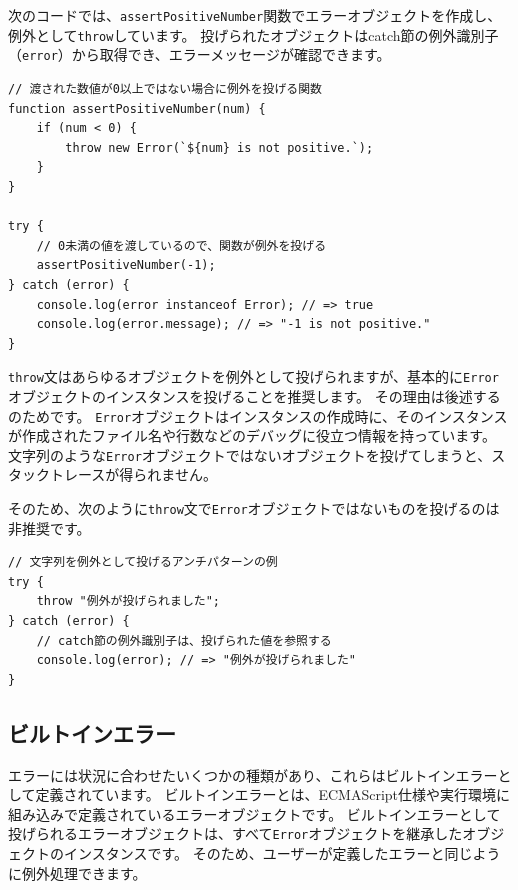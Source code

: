 次のコードでは、\texttt{assertPositiveNumber}関数でエラーオブジェクトを作成し、例外として\texttt{throw}しています。
投げられたオブジェクトはcatch節の例外識別子（\texttt{error}）から取得でき、エラーメッセージが確認できます。

\begin{lstlisting}
// 渡された数値が0以上ではない場合に例外を投げる関数
function assertPositiveNumber(num) {
    if (num < 0) {
        throw new Error(`${num} is not positive.`);
    }
}

try {
    // 0未満の値を渡しているので、関数が例外を投げる
    assertPositiveNumber(-1);
} catch (error) {
    console.log(error instanceof Error); // => true
    console.log(error.message); // => "-1 is not positive."
}
\end{lstlisting}

\texttt{throw}文はあらゆるオブジェクトを例外として投げられますが、基本的に\texttt{Error}オブジェクトのインスタンスを投げることを推奨します。
その理由は後述する\textbf{}のためです。
\texttt{Error}オブジェクトはインスタンスの作成時に、そのインスタンスが作成されたファイル名や行数などのデバッグに役立つ情報を持っています。
文字列のような\texttt{Error}オブジェクトではないオブジェクトを投げてしまうと、スタックトレースが得られません。

そのため、次のように\texttt{throw}文で\texttt{Error}オブジェクトではないものを投げるのは非推奨です。

\begin{lstlisting}
// 文字列を例外として投げるアンチパターンの例
try {
    throw "例外が投げられました";
} catch (error) {
    // catch節の例外識別子は、投げられた値を参照する
    console.log(error); // => "例外が投げられました"
}
\end{lstlisting}

\hypertarget{built-in-error}{%
\subsection{ビルトインエラー}\label{built-in-error}}

エラーには状況に合わせたいくつかの種類があり、これらはビルトインエラーとして定義されています。
ビルトインエラーとは、ECMAScript仕様や実行環境に組み込みで定義されているエラーオブジェクトです。
ビルトインエラーとして投げられるエラーオブジェクトは、すべて\texttt{Error}オブジェクトを継承したオブジェクトのインスタンスです。
そのため、ユーザーが定義したエラーと同じように例外処理できます。


